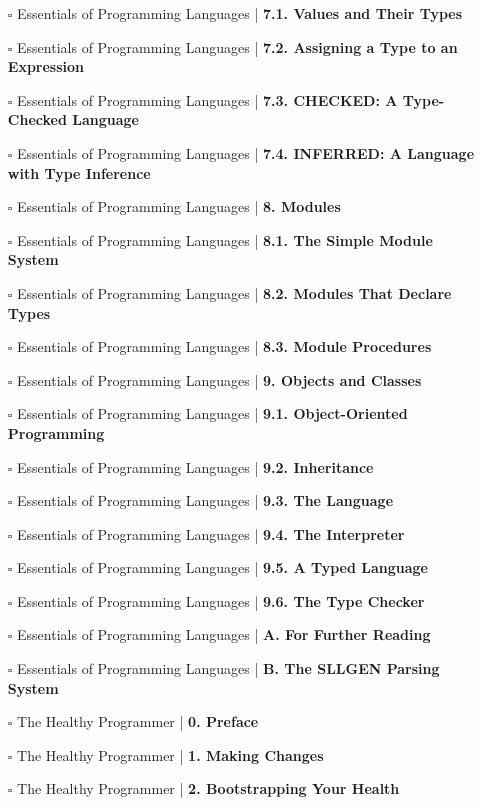 \documentclass[a4, landscape, 12pt]{article}
\newcommand{\checkbox}{$\square$}%
\begin{document}
\begin{itemize}
{}
\item [\checkbox]  Essentials of Programming Languages | \textbf{ 7.1. Values and Their Types
}
\item [\checkbox]  Essentials of Programming Languages | \textbf{ 7.2. Assigning a Type to an Expression
}
\item [\checkbox]  Essentials of Programming Languages | \textbf{ 7.3. CHECKED: A Type-Checked Language
}
\item [\checkbox]  Essentials of Programming Languages | \textbf{ 7.4. INFERRED: A Language with Type Inference
}
\item [\checkbox]  Essentials of Programming Languages | \textbf{ 8. Modules
}
\item [\checkbox]  Essentials of Programming Languages | \textbf{ 8.1. The Simple Module System
}
\item [\checkbox]  Essentials of Programming Languages | \textbf{ 8.2. Modules That Declare Types
}
\item [\checkbox]  Essentials of Programming Languages | \textbf{ 8.3. Module Procedures
}
\item [\checkbox]  Essentials of Programming Languages | \textbf{ 9. Objects and Classes
}
\item [\checkbox]  Essentials of Programming Languages | \textbf{ 9.1. Object-Oriented Programming
}
\item [\checkbox]  Essentials of Programming Languages | \textbf{ 9.2. Inheritance
}
\item [\checkbox]  Essentials of Programming Languages | \textbf{ 9.3. The Language
}
\item [\checkbox]  Essentials of Programming Languages | \textbf{ 9.4. The Interpreter
}
\item [\checkbox]  Essentials of Programming Languages | \textbf{ 9.5. A Typed Language
}
\item [\checkbox]  Essentials of Programming Languages | \textbf{ 9.6. The Type Checker
}
\item [\checkbox]  Essentials of Programming Languages | \textbf{ A. For Further Reading
}
\item [\checkbox]  Essentials of Programming Languages | \textbf{ B. The SLLGEN Parsing System
}
\item [\checkbox]  The Healthy Programmer | \textbf{ 0. Preface
}
\item [\checkbox]  The Healthy Programmer | \textbf{ 1. Making Changes
}
\item [\checkbox]  The Healthy Programmer | \textbf{ 2. Bootstrapping Your Health
}
\end{itemize}
\end{document}
